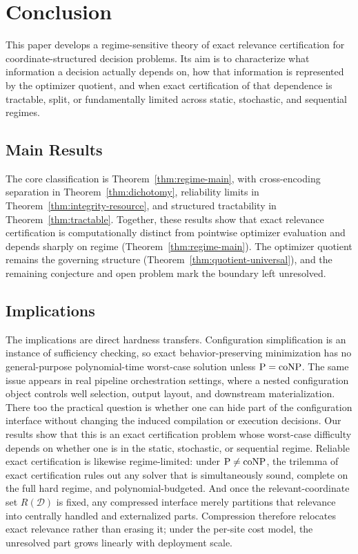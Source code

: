 \section{Conclusion}

This paper develops a regime-sensitive theory of exact relevance certification for coordinate-structured decision problems. Its aim is to characterize what information a decision actually depends on, how that information is represented by the optimizer quotient, and when exact certification of that dependence is tractable, split, or fundamentally limited across static, stochastic, and sequential regimes.

\subsection*{Main Results}

The core classification is Theorem~\ref{thm:regime-main}, with cross-encoding separation in Theorem~\ref{thm:dichotomy}, reliability limits in Theorem~\ref{thm:integrity-resource}, and structured tractability in Theorem~\ref{thm:tractable}.
Together, these results show that exact relevance certification is computationally distinct from pointwise optimizer evaluation and depends sharply on regime (Theorem~\ref{thm:regime-main}).
The optimizer quotient remains the governing structure (Theorem~\ref{thm:quotient-universal}), and the remaining conjecture and open problem mark the boundary left unresolved.

\subsection*{Implications}

The implications are direct hardness transfers. Configuration simplification is an instance of sufficiency checking, so exact behavior-preserving minimization has no general-purpose polynomial-time worst-case solution unless $\mathrm{P}=\mathrm{coNP}$. The same issue appears in real pipeline orchestration settings, where a nested configuration object controls well selection, output layout, and downstream materialization. There too the practical question is whether one can hide part of the configuration interface without changing the induced compilation or execution decisions. Our results show that this is an exact certification problem whose worst-case difficulty depends on whether one is in the static, stochastic, or sequential regime. Reliable exact certification is likewise regime-limited: under $\mathrm{P}\neq\mathrm{coNP}$, the trilemma of exact certification rules out any solver that is simultaneously sound, complete on the full hard regime, and polynomial-budgeted. And once the relevant-coordinate set $R(\mathcal{D})$ is fixed, any compressed interface merely partitions that relevance into centrally handled and externalized parts. Compression therefore relocates exact relevance rather than erasing it; under the per-site cost model, the unresolved part grows linearly with deployment scale.

